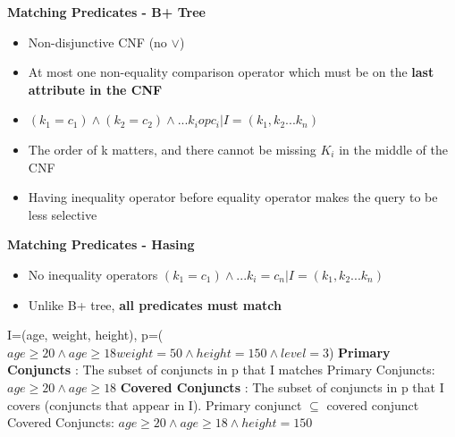 \documentclass[10pt, landscape]{article}
\begin{document}
\begin{multicols}{4}
\textbf{Matching Predicates - B+ Tree}
\begin{itemize}
  \item Non-disjunctive CNF (no $\lor$)
  \item At most one non-equality comparison operator which must be on the \textbf{last attribute in the CNF}
  \item $(k_1=c_1) \land (k_2=c_2) \land ...k_i op c_i | I=(k_1, k_2...k_n)$ 
  \item The order of k matters, and there cannot be missing $K_i$ in the middle of the CNF
  \item Having inequality operator before equality operator makes the query to be less selective 
\end{itemize}

\textbf{Matching Predicates - Hasing}
\begin{itemize}
  \item No inequality operators $(k_1=c_1) \land ... k_i =c_n | I=(k_1, k_2...k_n)$
  \item Unlike B+ tree, \textbf{all predicates must match}
\end{itemize}

I=(age, weight, height), p=($age \geq 20 \land age \geq 18 weight=50 \land height=150 \land level=3$) \newline
\textbf{Primary Conjuncts} : The subset of conjuncts in p that I matches \newline
Primary Conjuncts: $age \geq 20 \land age \geq 18$ \newline
\textbf{Covered Conjuncts} : The subset of conjuncts in p that I covers (conjuncts that appear in I). Primary conjunct $\subseteq$ covered conjunct \newline
Covered Conjuncts: $age \geq 20 \land age \geq 18 \land height=150$ \newline



\end{multicols}
\end{document}
